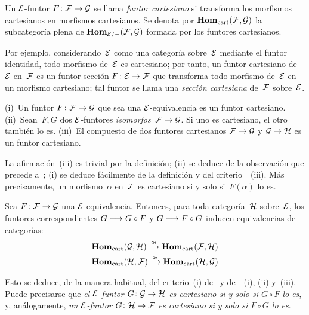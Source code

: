 \begin{definition}
\label{VI.5.2} Un $\cal{E}$-funtor $F\colon\cal{F}\to\cal{G}$ se llama
\emph{funtor cartesiano}
%
si transforma los morfismos cartesianos en morfismos cartesianos.
Se denota por $\SheafHom_\cart(\cal{F},\cal{G})$
\label{indnot:fq}%
la subcategoría plena de
$\SheafHom_{\cal{E}/-}(\cal{F},\cal{G})$ formada por los funtores
cartesianos.

Por ejemplo, considerando~$\cal{E}$ como una categoría sobre~$\cal{E}$
mediante el funtor identidad, todo morfismo de~$\cal{E}$ es cartesiano; por
tanto, un funtor cartesiano de~$\cal{E}$ en~$\cal{F}$ es un funtor sección
$F\colon\cal{E}\to\cal{F}$ que transforma todo morfismo de~$\cal{E}$ en
un morfismo cartesiano; tal funtor se llama una \emph{sección cartesiana}
de~$\cal{F}$ sobre~$\cal{E}$.
\end{definition}

\begin{proposition}
\label{VI.5.3} \textup{(i)}~Un funtor $F\colon\cal{F}\to\cal{G}$ que sea
una $\cal{E}$-equivalencia es un funtor cartesiano.
\textup{(ii)}~Sean~$F,G$ dos $\cal{E}$-funtores
\emph{isomorfos}~$\cal{F}\to\cal{G}$. Si uno es cartesiano, el otro también
lo es. \textup{(iii)}~El compuesto de dos funtores cartesianos
$\cal{F}\to\cal{G}$ y $\cal{G}\to\cal{H}$ es un funtor cartesiano.
\end{proposition}

La afirmación~(iii) es trivial por la definición; (ii) se deduce de la
observación que precede a~; (i) se deduce fácilmente de la
definición y del criterio~~(iii). Más precisamente, un
morfismo~$\alpha$ en~$\cal{F}$ es cartesiano si y solo si~$F(\alpha)$ lo
es.

\begin{corollaire}
\label{VI.5.4}
Sea $F\colon\cal{F}\to\cal{G}$ una $\cal{E}$-equivalencia. Entonces, para
toda categoría~$\cal{H}$ sobre~$\cal{E}$, los funtores correspondientes
$G\mto G\circ F$ y $G\mto F\circ G$ inducen equivalencias de categorías:
\begin{eqnarray*}
\SheafHom_\cart(\cal{G},\cal{H})\lto{\approx}
\SheafHom_\cart(\cal{F},\cal{H})\\
\SheafHom_\cart(\cal{H},\cal{F})\lto{\approx}
\SheafHom_\cart(\cal{H},\cal{G})
\end{eqnarray*}
\end{corollaire}

Esto se deduce, de la manera habitual, del criterio~(i) de~ y
de~~(i), (ii) y~(iii).
Puede precisarse que \emph{el $\cal{E}$-funtor
$G\colon\cal{G}\to\cal{H}$ es cartesiano si y solo si $G\circ F$ lo es},
y, análogamente, \emph{un $\cal{E}$-funtor
$G\colon\cal{H}\to\cal{F}$ es cartesiano si y solo si $F\circ G$ lo es}.

